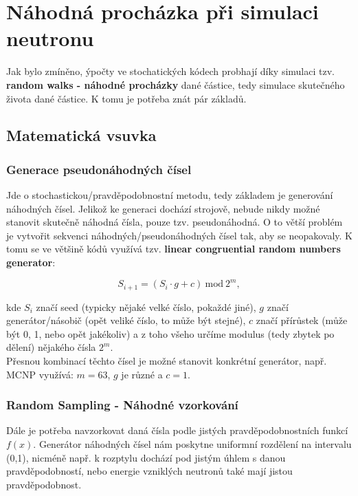 \section{Náhodná procházka při simulaci neutronu}

Jak bylo zmíněno, ýpočty ve stochatických kódech probhají díky simulaci tzv. \textbf{random walks - náhodné procházky} dané částice, tedy simulace skutečného života dané částice. K tomu je potřeba znát pár základů.

\subsection{Matematická vsuvka}

\subsubsection{Generace pseudonáhodných čísel}

Jde o stochastickou/pravděpodobnostní metodu, tedy základem je generování náhodných čísel. Jelikož ke generaci dochází strojově, nebude nikdy možné stanovit skutečně náhodná čísla, pouze tzv. pseudonáhodná. O to větší problém je vytvořit sekvenci náhodných/pseudonáhodných čísel tak, aby se neopakovaly. K tomu se ve většině kódů využívá tzv. \textbf{linear congruential random numbers generator}:

$$ S_{i+1} = ( S_i \cdot g + c ) \: \text{mod} \: 2^m, $$

kde $S_i$ značí seed (typicky nějaké velké číslo, pokaždé jiné), $g$ značí generátor/násobič (opět veliké číslo, to může být stejné), $c$ značí přírůstek (může být 0, 1, nebo opět jakékoliv) a z toho všeho určíme modulus (tedy zbytek po dělení) nějakého čísla $2^m$.\\

Přesnou kombinací těchto čísel je možné stanovit konkrétní generátor, např. MCNP využívá: $m = 63$, $g$ je různé a $c = 1$.

\subsubsection{Random Sampling - Náhodné vzorkování}

Dále je potřeba navzorkovat daná čísla podle jistých pravděpodobnostních funkcí $f(x)$. Generátor náhodných čísel nám poskytne uniformní rozdělení na intervalu (0,1), nicméně např. k rozptylu dochází pod jistým úhlem s danou pravděpodobností, nebo energie vzniklých neutronů také mají jistou pravděpodobnost.\\

